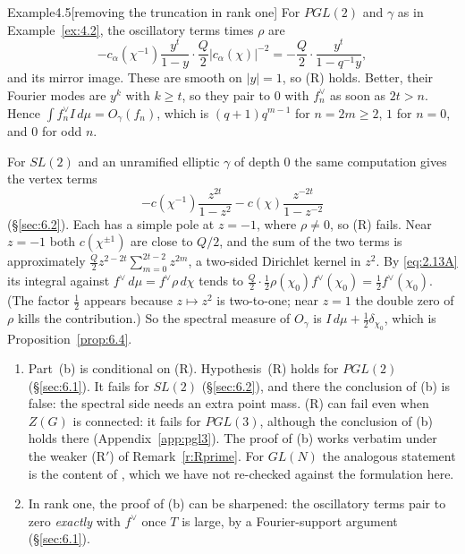 \documentclass[12pt,letterpaper]{article}
\numberwithin{equation}{section}
\theoremstyle{plain}
\theoremstyle{remark}
\theoremstyle{plain}
\theoremstyle{definition}
\theoremstyle{remark}
\theoremstyle{remark}
\begin{document}
\begin{fixedrem}{Example}{4.5}[removing the truncation in rank one]\label{ex:4.5}
For $PGL(2)$ and $\gamma$ as in Example~\ref{ex:4.2}, the oscillatory terms times $\rho$ are
\[
-c_\alpha(\chi^{-1})\frac{y^t}{1-y}\cdot\frac Q2|c_\alpha(\chi)|^{-2}=-\frac Q2\cdot\frac{y^t}{1-q^{-1}y},
\]
and its mirror image. These are smooth on $|y|=1$, so (R) holds. Better, their Fourier modes are $y^k$ with $k\ge t$, so they pair to $0$ with $f_n^\vee$ as soon as $2t>n$. Hence $\int f_n^\vee I\,d\mu=O_\gamma(f_n)$, which is $(q+1)q^{m-1}$ for $n=2m\ge2$, $1$ for $n=0$, and $0$ for odd $n$.

For $SL(2)$ and an unramified elliptic $\gamma$ of depth $0$ the same computation gives the vertex terms
\[
-c(\chi^{-1})\frac{z^{2t}}{1-z^2}-c(\chi)\frac{z^{-2t}}{1-z^{-2}}
\]
(\S\ref{sec:6.2}). Each has a simple pole at $z=-1$, where $\rho\ne0$, so (R) fails. Near $z=-1$ both $c(\chi^{\pm1})$ are close to $Q/2$, and the sum of the two terms is approximately $\frac Q2z^{2-2t}\sum_{m=0}^{2t-2}z^{2m}$, a two-sided Dirichlet kernel in $z^2$. By \eqref{eq:2.13A} its integral against $f^\vee\,d\mu=f^\vee\rho\,d\chi$ tends to $\frac Q2\cdot\frac12\rho(\chi_0)f^\vee(\chi_0)=\frac12f^\vee(\chi_0)$. (The factor $\frac12$ appears because $z\mapsto z^2$ is two-to-one; near $z=1$ the double zero of $\rho$ kills the contribution.) So the spectral measure of $O_\gamma$ is $I\,d\mu+\frac12\delta_{\chi_0}$, which is Proposition~\ref{prop:6.4}.
\end{fixedrem}

\begin{rem26}\label{r:T45}
\begin{enumerate}
\item Part~(b) is conditional on (R). Hypothesis~(R) holds for $PGL(2)$ (\S\ref{sec:6.1}). It fails for $SL(2)$ (\S\ref{sec:6.2}), and there the conclusion of (b) is false: the spectral side needs an extra point mass. (R) can fail even when $Z(G)$ is connected: it fails for $PGL(3)$, although the conclusion of (b) holds there (Appendix~\ref{app:pgl3}). The proof of (b) works verbatim under the weaker (R$'$) of Remark~\ref{r:Rprime}. For $GL(N)$ the analogous statement is the content of \cite{Wa89a}, which we have not re-checked against the formulation here.
\item In rank one, the proof of (b) can be sharpened: the oscillatory terms pair to zero \emph{exactly} with $f^\vee$ once $T$ is large, by a Fourier-support argument (\S\ref{sec:6.1}).
\end{enumerate}
\end{rem26}
\end{document}
